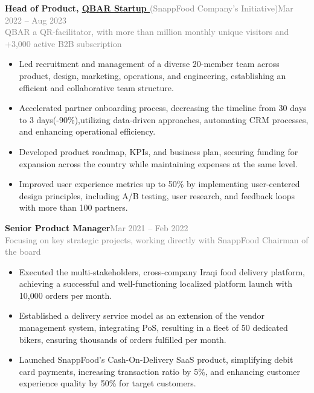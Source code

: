 \documentclass[a4paper,10.9pt]{article}
\newcommand{\position}[1]{\Large\bfseries #1}\vspace{0.2em}
\newcommand{\bulletitem}[1]{\item #1\vspace{0.1em}}
\newcommand{\graytext}[1]{\textcolor{grey}{#1}} %
\begin{document}
\begin{adjustwidth}{0.5cm}{0cm}

{{\position{Head of Product, }\large{\href{https://qbar.ir/OmanBakery}{QBAR Startup \faExternalLink{} }}}{\small{\graytext{(SnappFood Company’s Initiative)}}}\hfill \large\graytext{Mar 2022 – Aug 2023}}
\\
{\small\graytext{QBAR a QR-facilitator, with more than million monthly unique visitors and +3,000 active B2B subscription}}
\begin{adjustwidth}{0.5cm}{0cm}
\normalsize
\begin{itemize}
  \bulletitem{Led recruitment and management of a diverse 20-member team across product, design, marketing, operations, and engineering, establishing an efficient and collaborative team structure.}
  \bulletitem{Accelerated partner onboarding process, decreasing the timeline from 30 days to 3 days(-90\%),utilizing data-driven approaches, automating CRM processes, and enhancing operational efficiency.}
  \bulletitem{Developed product roadmap, KPIs, and business plan, securing funding for expansion across the country while maintaining expenses at the same level.}
  \bulletitem{Improved user experience metrics up to 50\% by implementing user-centered design principles, including A/B testing, user research, and feedback loops with more than 100 partners.}
\end{itemize}
\end{adjustwidth}
\vspace{3pt}

{{\position{Senior Product Manager}}\hfill {\large\graytext{Mar 2021 – Feb 2022}}}
\\
{\small\graytext{Focusing on key strategic projects, working directly with SnappFood Chairman of the board}}
\normalsize
\begin{adjustwidth}{0.5cm}{0cm}
\begin{itemize}
  \bulletitem{Executed the multi-stakeholders, cross-company Iraqi food delivery platform, achieving a successful and well-functioning localized platform launch with 10,000 orders per month.}
  \bulletitem{Established a delivery service model as an extension of the vendor management system, integrating PoS, resulting in a fleet of 50 dedicated bikers, ensuring thousands of orders fulfilled per month.}
  \bulletitem{Launched SnappFood’s Cash-On-Delivery SaaS product, simplifying debit card payments, increasing transaction ratio by 5\%, and enhancing customer experience quality by 50\% for target customers.}
\end{itemize}
\end{adjustwidth}
\vspace{3pt}


\end{adjustwidth}
\end{document}
